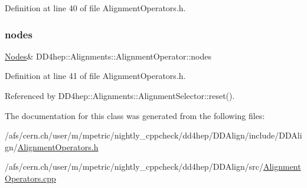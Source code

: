 Definition at line 40 of file Alignment\+Operators.\+h.

\hypertarget{class_d_d4hep_1_1_alignments_1_1_alignment_operator_a3af1a13de9f4772b04471070b6b99676}{}\label{class_d_d4hep_1_1_alignments_1_1_alignment_operator_a3af1a13de9f4772b04471070b6b99676} 
\subsubsection{\texorpdfstring{nodes}{nodes}}
{\footnotesize\ttfamily \hyperlink{class_d_d4hep_1_1_alignments_1_1_alignment_operator_a2f25eae1d38abc30a09f7a840ab0662a}{Nodes}\& D\+D4hep\+::\+Alignments\+::\+Alignment\+Operator\+::nodes}



Definition at line 41 of file Alignment\+Operators.\+h.



Referenced by D\+D4hep\+::\+Alignments\+::\+Alignment\+Selector\+::reset().



The documentation for this class was generated from the following files\+:\begin{DoxyCompactItemize}
\item 
/afs/cern.\+ch/user/m/mpetric/nightly\+\_\+cppcheck/dd4hep/\+D\+D\+Align/include/\+D\+D\+Align/\hyperlink{_alignment_operators_8h}{Alignment\+Operators.\+h}\item 
/afs/cern.\+ch/user/m/mpetric/nightly\+\_\+cppcheck/dd4hep/\+D\+D\+Align/src/\hyperlink{_alignment_operators_8cpp}{Alignment\+Operators.\+cpp}\end{DoxyCompactItemize}
